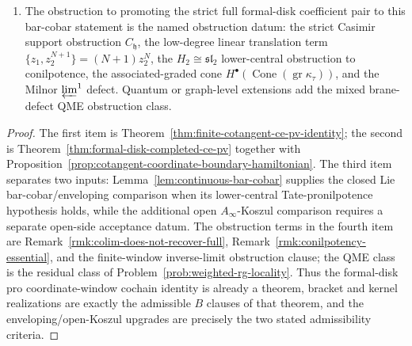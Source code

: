 \documentclass[11pt]{memoir}
\begin{document}
\begin{thm}
\begin{enumerate}
	      upgrades only to the admissible bar-cobar/enveloping statement
	      \[
	        \bigl(C^\bullet_{\mathrm{CE},\mathrm{cont}}
	          (\mathfrak g_{\mathrm{adm}})\bigr)^!
	        \simeq \widehat U(\mathfrak g_{\mathrm{adm}}).
	      \]
	      If, in addition, an open-trace \(A_\infty\)-Koszul acceptance datum
	      \((A_{\mathrm{op}},C_{\mathrm{op}},B_{\mathrm{CE/PV}},
	      \tau_{\mathrm{op}})\) is supplied and its obstruction complex is exact,
	      then
	      \[
	        \Omega\mathrm{Bar}(A_{\mathrm{op}})
	        \xrightarrow{\sim}B_{\mathrm{CE/PV}},
	        \qquad
	        A_{\mathrm{op}}\simeq B_{\mathrm{CE/PV}} .
	      \]
	      If the CE-side cobar comparison also passes the same finite-window
	      and \(\varprojlim^1\) tests, then
	      \[
	        C^\bullet_{\mathrm{CE},\mathrm{cont}}(\mathfrak g_{\mathrm{adm}})
	        \simeq A_{\mathrm{op}}^! .
	      \]
    \item The obstruction to promoting the strict full formal-disk
      coefficient pair to this bar-cobar statement is the named obstruction
      datum: the strict Casimir support obstruction \(C_{\mathfrak h}\),
      the low-degree linear translation term
      \(\{z_1,z_2^{N+1}\}=(N+1)z_2^N\), the
      \(H_2\cong\mathfrak{sl}_2\) lower-central obstruction to
      conilpotence, the associated-graded cone
      \(H^\bullet(\operatorname{Cone}(\operatorname{gr}\kappa_\tau))\),
      and the Milnor \(\varprojlim^1\) defect.  Quantum or graph-level
      extensions add the mixed brane-defect QME obstruction class.
  \end{enumerate}
\end{thm}

\begin{proof}
	  The first item is
	  Theorem~\ref{thm:finite-cotangent-ce-pv-identity}; the second is
	  Theorem~\ref{thm:formal-disk-completed-ce-pv} together with
  Proposition~\ref{prop:cotangent-coordinate-boundary-hamiltonian}.  The
	  third item separates two inputs: Lemma~\ref{lem:continuous-bar-cobar}
	  supplies the closed Lie bar-cobar/enveloping comparison when its
	  lower-central Tate-pronilpotence hypothesis holds, while the additional
	  open \(A_\infty\)-Koszul comparison requires a separate open-side
	  acceptance datum.  The obstruction
  terms in the fourth item are
  Remark~\ref{rmk:colim-does-not-recover-full},
  Remark~\ref{rmk:conilpotency-essential}, and the finite-window
  inverse-limit obstruction clause; the QME class is the
  residual class of Problem~\ref{prob:weighted-rg-locality}.  Thus the
		  formal-disk pro coordinate-window cochain identity is already a theorem,
	  bracket and kernel realizations are exactly the admissible \(B\)
		  clauses of that theorem, and the enveloping/open-Koszul upgrades are
		  precisely the two stated admissibility criteria.
\end{proof}
\end{document}
